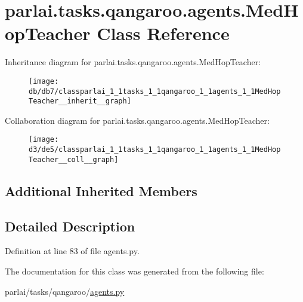 \hypertarget{classparlai_1_1tasks_1_1qangaroo_1_1agents_1_1MedHopTeacher}{}\section{parlai.\+tasks.\+qangaroo.\+agents.\+Med\+Hop\+Teacher Class Reference}
\label{classparlai_1_1tasks_1_1qangaroo_1_1agents_1_1MedHopTeacher}


Inheritance diagram for parlai.\+tasks.\+qangaroo.\+agents.\+Med\+Hop\+Teacher\+:
\nopagebreak
\begin{figure}[H]
\begin{center}
\leavevmode
\texttt{[image: db/db7/classparlai\_1\_1tasks\_1\_1qangaroo\_1\_1agents\_1\_1MedHopTeacher\_\_inherit\_\_graph]}
\end{center}
\end{figure}


Collaboration diagram for parlai.\+tasks.\+qangaroo.\+agents.\+Med\+Hop\+Teacher\+:
\nopagebreak
\begin{figure}[H]
\begin{center}
\leavevmode
\texttt{[image: d3/de5/classparlai\_1\_1tasks\_1\_1qangaroo\_1\_1agents\_1\_1MedHopTeacher\_\_coll\_\_graph]}
\end{center}
\end{figure}
\subsection*{Additional Inherited Members}


\subsection{Detailed Description}


Definition at line 83 of file agents.\+py.



The documentation for this class was generated from the following file\+:\begin{DoxyCompactItemize}
\item 
parlai/tasks/qangaroo/\hyperlink{parlai_2tasks_2qangaroo_2agents_8py}{agents.\+py}\end{DoxyCompactItemize}
